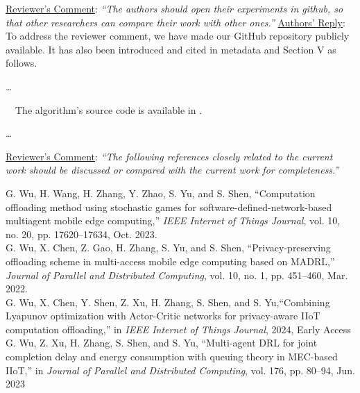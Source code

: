 \documentclass[12pt,draftclsnofoot,onecolumn]{IEEEtran}
\newcommand{\rev}[1]{{\color{blue}#1}} %
\newcommand{\rev}[1]{#1}
\newenvironment{my}[2]%
{\begin{list}{}%
{\setlength{\rightmargin}{#1}\setlength{\leftmargin}{#2}}%


 \item[]{}

} {\end{list}}
\begin{document}
\begin{enumerate}
\vspace{10mm}
	\item \underline{Reviewer's Comment}: 
	\textit{``The authors should open their experiments in github, so that other researchers can compare their work with other ones.''} \newline
	\underline{Authors' Reply}: To address the reviewer comment, we have made our GitHub repository  publicly available. It has also been introduced and cited in metadata and Section V as follows.
	
	\begin{my}{1cm}{1cm}
		\rev{
			
			\dots
			
			\,\,\,\,  The algorithm's source code is available in \cite{QECO}.
			
			\dots
	}
	\end{my} \vspace{6mm}




	\item \underline{Reviewer's Comment}: 
	\textit{``The following references closely related to the current work should be discussed or compared with the current work for completeness.''} \newline
		\begin{my}{1cm}{1cm}
		\rev{
			{\small
				\noindent\hspace{-0.5mm}\cite{wu2023computation} G. Wu, H. Wang, H. Zhang, Y. Zhao, S. Yu, and S. Shen, ``Computation offloading method using stochastic games for software-defined-network-based multiagent mobile edge computing,'' \textit{IEEE Internet of Things Journal}, vol. 10, no. 20, pp. 17620–17634, Oct. 2023.\\[6pt]
				\cite{wu2024privacy} G. Wu, X. Chen, Z. Gao, H. Zhang, S. Yu, and S. Shen, ``Privacy-preserving offloading scheme in multi-access mobile edge computing based on MADRL,'' \textit{Journal of Parallel and Distributed Computing}, vol. 10, no. 1, pp. 451--460, Mar. 2022.\\[6pt]
				\cite{wu2024combining}  G. Wu, X. Chen, Y. Shen, Z. Xu, H. Zhang, S. Shen, and S. Yu,``Combining Lyapunov optimization with Actor-Critic networks for privacy-aware IIoT computation offloading,'' in \textit{IEEE Internet of Things Journal}, 2024, Early Access\\[6pt]
				\cite{wu2023multi} G. Wu, Z. Xu, H. Zhang, S. Shen, and S. Yu,  ``Multi-agent DRL for joint completion delay and energy consumption with queuing theory in MEC-based IIoT,'' in \textit{Journal of Parallel and Distributed Computing}, vol. 176, pp. 80–94, Jun. 2023\\[6pt]}\\}
	\end{my}


\end{enumerate}
\end{document}
